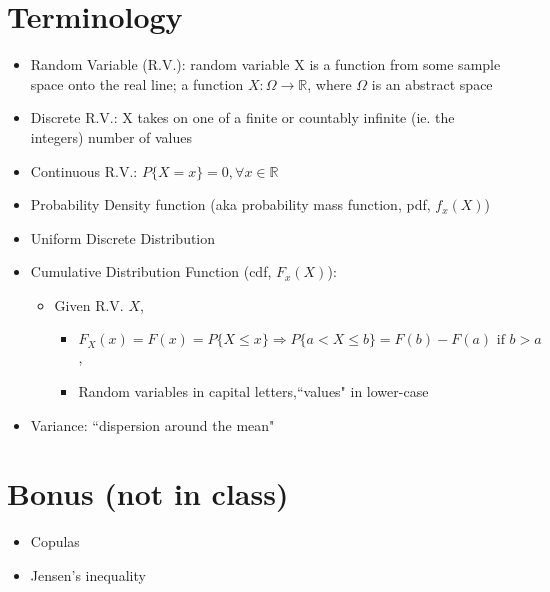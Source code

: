 \documentclass[10pt, oneside]{article}
\newcommand{\R}{\mathbb{R}}
\begin{document}
\section{Terminology}
\begin{itemize}
    \item Random Variable (R.V.): random variable X is a function from some sample space onto the real line; a function $X: \Omega \rightarrow \R$, where $\Omega$ is an abstract space
    \item Discrete R.V.: X takes on one of a finite or countably infinite (ie. the integers) number of values
    \item Continuous R.V.: $P\{X=x\}=0, \forall x \in \R$
    \item Probability Density function (aka probability mass function, pdf, $f_x(X)$)
    \item Uniform Discrete Distribution
    \item Cumulative Distribution Function (cdf, $F_x(X)$): 
    \begin{itemize}
        \item Given R.V. $X$, 
        \begin{itemize}
            \item $F_X(x) = F(x)=P\{X\leq x\}\Rightarrow P\{a<X\leq b\}=F(b)-F(a) \text{ if } b> a$, 
            \item Random variables in capital letters,``values" in lower-case
        \end{itemize}
        
    \end{itemize}
    \item Variance: ``dispersion around the mean"
\end{itemize}


\section{Bonus (not in class)}
\begin{itemize}
    \item Copulas
    \item Jensen's inequality
\end{itemize}
\end{document}
